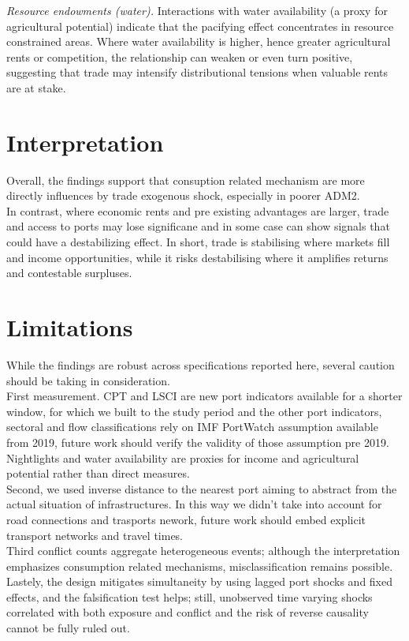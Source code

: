 \textit{Resource endowments (water).} Interactions with water availability (a proxy for agricultural potential) indicate that the pacifying effect concentrates in resource constrained areas. Where water availability is higher, hence greater agricultural rents or competition, the relationship can weaken or even turn positive, suggesting that trade may intensify distributional tensions when valuable rents are at stake. \\


\section{Interpretation}
Overall, the findings support that consuption related mechanism are more directly influences by trade exogenous shock, especially in poorer ADM2. \\
In contrast, where economic rents and pre existing advantages are larger, trade and access to ports may lose significane and in some case can show signals that could have a destabilizing effect. In short, trade is stabilising where markets fill and income opportunities, while it risks destabilising where it amplifies returns and contestable surpluses. 

\section{Limitations}
While the findings are robust across specifications reported here, several caution should be taking in consideration. \\

First measurement. CPT and LSCI are new port indicators available for a shorter window, for which we built to the study period and the other port indicators, sectoral and flow classifications rely on IMF PortWatch assumption available from 2019, future work should verify the validity of those assumption pre 2019. Nightlights and water availability are proxies for income and agricultural potential rather than direct measures.\\
Second, we used inverse distance to the nearest port aiming to abstract from the actual situation of infrastructures. In this way we didn't take into account for road connections and trasports nework, future work should embed explicit transport networks and travel times. \\
Third conflict counts aggregate heterogeneous events; although the interpretation emphasizes consumption related mechanisms, misclassification remains possible.\\
Lastely, the design mitigates simultaneity by using lagged port shocks and fixed effects, and the falsification test helps; still, unobserved time varying shocks correlated with both exposure and conflict and the risk of reverse causality  cannot be fully ruled out.

